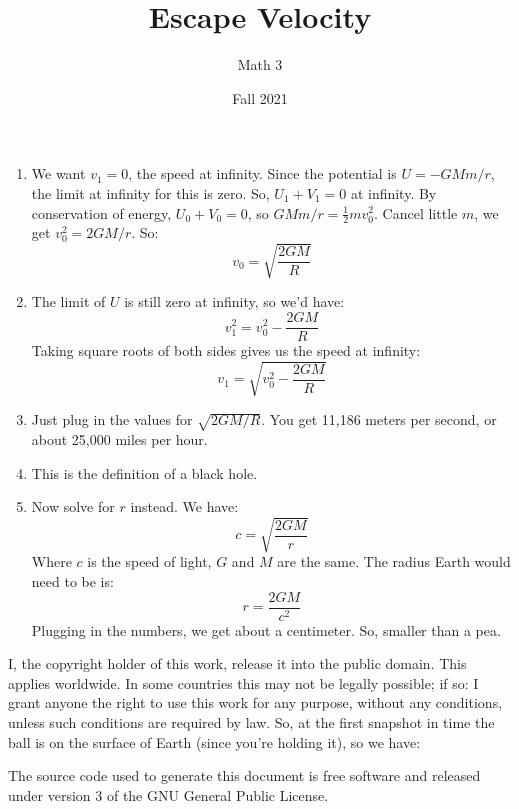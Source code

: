 \documentclass{article}
\title{Escape Velocity}
\author{Math 3}
\date{Fall 2021}
\begin{document}
    \maketitle
    \begin{enumerate}
        \item   We want $v_{1}=0$, the speed at infinity. Since the potential is
                $U=-GMm/r$, the limit at infinity for this is zero. So,
                $U_{1}+V_{1}=0$ at infinity. By conservation of energy,
                $U_{0}+V_{0}=0$, so $GMm/r=\frac{1}{2}mv_{0}^{2}$. Cancel little
                $m$, we get $v_{0}^{2}=2GM/r$. So:
                \begin{equation}
                  v_{0}=\sqrt{\frac{2GM}{R}}
                \end{equation}
        \item   The limit of $U$ is still zero at infinity, so we'd have:
                \begin{equation}
                    v_{1}^{2}=v_{0}^{2}-\frac{2GM}{R}
                \end{equation}
                Taking square roots of both sides gives us the speed at
                infinity:
                \begin{equation}
                    v_{1}=\sqrt{v_{0}^{2}-\frac{2GM}{R}}
                \end{equation}
        \item   Just plug in the values for $\sqrt{2GM/R}$. You get
                11,186 meters per second, or about 25,000 miles per hour.
        \item   This is the definition of a black hole.
        \item   Now solve for $r$ instead. We have:
                \begin{equation}
                    c=\sqrt{\frac{2GM}{r}}
                \end{equation}
                Where $c$ is the speed of light, $G$ and $M$ are the same. The
                radius Earth would need to be is:
                \begin{equation}
                    r=\frac{2GM}{c^{2}}
                \end{equation}
                Plugging in the numbers, we get about a centimeter. So, smaller
                than a pea.
    \end{enumerate}
    \newpage
    I, the copyright holder of this work, release it into the public domain.
    This applies worldwide. In some countries this may not be legally possible;
    if so: I grant anyone the right to use this work for any purpose, without
    any conditions, unless such conditions are required by law. So, at the
    first snapshot in time the ball is on the surface of Earth (since you're
    holding it), so we have:
    \par\hfill\par
    The source code used to generate this document is free software and released
    under version 3 of the GNU General Public License.
\end{document}
